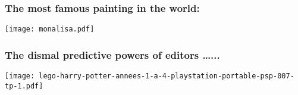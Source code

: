 












\begin{frame}
  \frametitle{The most famous painting in the world:}

  \begin{center}
    \texttt{[image: monalisa.pdf]}%
  \end{center}



\end{frame}


\begin{frame}
  \frametitle{The dismal predictive powers of editors \ldots...}

  \begin{center}
    \texttt{[image: lego-harry-potter-annees-1-a-4-playstation-portable-psp-007-tp-1.pdf]}
  \end{center}





\end{frame}

